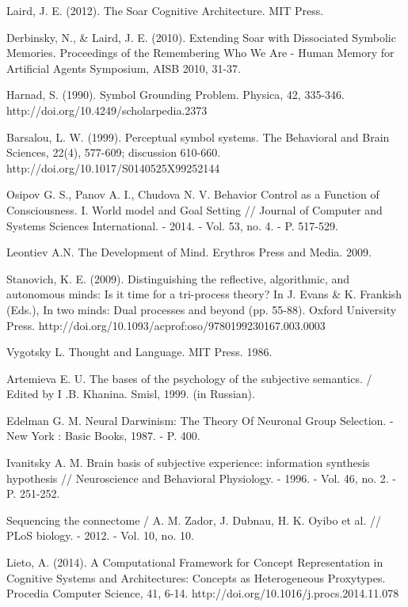 \documentclass[review]{elsarticle}
\begin{document}
\begin{thebibliography}{9}
	 Laird, J. E. (2012). The Soar Cognitive Architecture. MIT Press.
	
	 Derbinsky, N., \& Laird, J. E. (2010). Extending Soar with Dissociated Symbolic Memories. Proceedings of the Remembering Who We Are - Human Memory for Artificial Agents Symposium, AISB 2010, 31-37.

	 Harnad, S. (1990). Symbol Grounding Problem. Physica, 42, 335-346. http://doi.org/10.4249/scholarpedia.2373
	
	 Barsalou, L. W. (1999). Perceptual symbol systems. The Behavioral and Brain Sciences, 22(4), 577-609; discussion 610-660. http://doi.org/10.1017/S0140525X99252144
	
	 Osipov G. S., Panov A. I., Chudova N. V. Behavior Control as a Function of Consciousness. I. World model and Goal Setting // Journal of Computer and Systems Sciences International. - 2014. - Vol. 53, no. 4. - P. 517-529.

	 Leontiev A.N. The Development of Mind. Erythros Press and Media. 2009.
	
	 Stanovich, K. E. (2009). Distinguishing the reflective, algorithmic, and autonomous minds: Is it time for a tri-process theory? In J. Evans \& K. Frankish (Eds.), In two minds: Dual processes and beyond (pp. 55-88). Oxford University Press. http://doi.org/10.1093/acprof:oso/9780199230167.003.0003

	 Vygotsky L. Thought and Language. MIT Press. 1986.

	 Artemieva E. U. The bases of the psychology of the subjective semantics. / Edited by I .B. Khanina. Smisl, 1999. (in Russian).
	
	 Edelman G. M. Neural Darwinism: The Theory Of Neuronal Group Selection. - New York : Basic Books, 1987. - P. 400.
	
	 Ivanitsky A. M. Brain basis of subjective experience: information synthesis hypothesis // Neuroscience and Behavioral Physiology. - 1996. - Vol. 46, no. 2. - P. 251-252.
	
	 Sequencing the connectome / A. M. Zador, J. Dubnau, H. K. Oyibo et al. // PLoS biology. - 2012. - Vol. 10, no. 10.

	 Lieto, A. (2014). A Computational Framework for Concept Representation in Cognitive Systems and Architectures: Concepts as Heterogeneous Proxytypes. Procedia Computer Science, 41, 6-14. http://doi.org/10.1016/j.procs.2014.11.078
	

\end{thebibliography}
\end{document}
